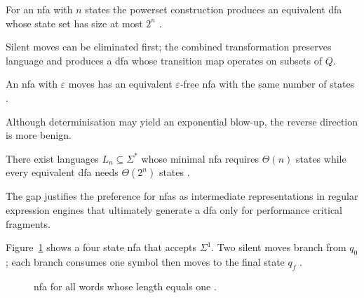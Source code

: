 \begin{theorem}\label{thm:subset}
For an \gls{nfa} with $n$ states the powerset construction produces an
equivalent \gls{dfa} whose state set has size at most $2^{n}$
\cite{rabin1959finite}.  
\end{theorem}

Silent moves can be eliminated first; the combined transformation
preserves language and produces a \gls{dfa} whose transition map
operates on subsets of $Q$.

\begin{proposition}\label{prop:eps-removal}
An \gls{nfa} with $\varepsilon$ moves has an equivalent
$\varepsilon$-free \gls{nfa} with the same number of states
\cite{hopcroft2001introduction}.
\end{proposition}

Although determinisation may yield an exponential blow-up, the reverse
direction is more benign.

\begin{observation}\label{obs:nfa-size}
There exist languages $L_{n}\subseteq\Sigma^{\ast}$ whose minimal
\gls{nfa} requires $\Theta(n)$ states while every equivalent
\gls{dfa} needs $\Theta(2^{n})$ states
\cite{aho1974design}.
\end{observation}

The gap justifies the preference for \glspl{nfa} as intermediate
representations in regular expression engines that ultimately generate a
\gls{dfa} only for performance critical fragments.

\begin{example}\label{ex:nfa-length1}
Figure~\ref{fig:nfa-figure} shows a four state \gls{nfa} that accepts
$\Sigma^{1}$.  Two silent moves branch from $q_{0}$; each branch consumes
one symbol then moves to the final state $q_{f}$
\cite{rabin1959finite}.
\end{example}

\begin{figure}[H]
    \centering
    \caption{\gls{nfa} for all words whose length equals one
             \cite{rabin1959finite}.}
    \label{fig:nfa-figure}
\end{figure}

